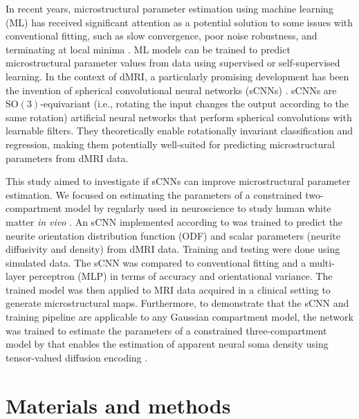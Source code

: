 \documentclass[10pt, letterpaper, oneside]{article}
\begin{document}
In recent years, microstructural parameter estimation using machine learning (ML) has received significant attention as a potential solution to some issues with conventional fitting, such as slow convergence, poor noise robustness, and terminating at local minima \citep{golkov2016q, barbieri2020deep, palombo2020sandi, karimi2021deep, gyori2021potential, de2021neural, elaldi2021equivariant, sedlar2021diffusion, sedlar2021spherical, gyori2022training, kerkela2022improved}. ML models can be trained to predict microstructural parameter values from data using supervised or self-supervised learning. In the context of dMRI, a particularly promising development has been the invention of spherical convolutional neural networks (sCNNs) \citep{cohen2018spherical, esteves2018learning}. sCNNs are $\text{SO}(3)$-equivariant (i.e., rotating the input changes the output according to the same rotation) artificial neural networks that perform spherical convolutions with learnable filters. They theoretically enable rotationally invariant classification and regression, making them potentially well-suited for predicting microstructural parameters from dMRI data.

This study aimed to investigate if sCNNs can improve microstructural parameter estimation. We focused on estimating the parameters of a constrained two-compartment model by \cite{kaden2016multi} regularly used in neuroscience to study human white matter \textit{in vivo} \citep{collins2019white, voldsbekk2021sleep, toescu2021tractographic, rahmanzadeh2022new, battocchio2022bundle}. An sCNN implemented according to \cite{esteves2018learning} was trained to predict the neurite orientation distribution function (ODF) and scalar parameters (neurite diffusivity and density) from dMRI data. Training and testing were done using simulated data. The sCNN was compared to conventional fitting and a multi-layer perceptron (MLP) in terms of accuracy and orientational variance. The trained model was then applied to MRI data acquired in a clinical setting to generate microstructural maps. Furthermore, to demonstrate that the sCNN and training pipeline are applicable to any Gaussian compartment model, the network was trained to estimate the parameters of a constrained three-compartment model by \cite{gyori2021potential} that enables the estimation of apparent neural soma density using tensor-valued diffusion encoding \citep{topgaard2017multidimensional}.

\section{Materials and methods}
\end{document}
